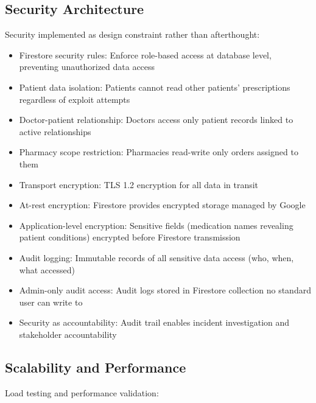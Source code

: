\documentclass[12pt,a4paper]{report}
\begin{document}
\subsection{Security Architecture}

Security implemented as design constraint rather than afterthought:

\begin{itemize}
  \item Firestore security rules: Enforce role-based access at database level, preventing unauthorized data access
  \item Patient data isolation: Patients cannot read other patients' prescriptions regardless of exploit attempts
  \item Doctor-patient relationship: Doctors access only patient records linked to active relationships
  \item Pharmacy scope restriction: Pharmacies read-write only orders assigned to them
  \item Transport encryption: TLS 1.2 encryption for all data in transit
  \item At-rest encryption: Firestore provides encrypted storage managed by Google
  \item Application-level encryption: Sensitive fields (medication names revealing patient conditions) encrypted before Firestore transmission
  \item Audit logging: Immutable records of all sensitive data access (who, when, what accessed)
  \item Admin-only audit access: Audit logs stored in Firestore collection no standard user can write to
  \item Security as accountability: Audit trail enables incident investigation and stakeholder accountability
\end{itemize}

\subsection{Scalability and Performance}

Load testing and performance validation:
\end{document}
